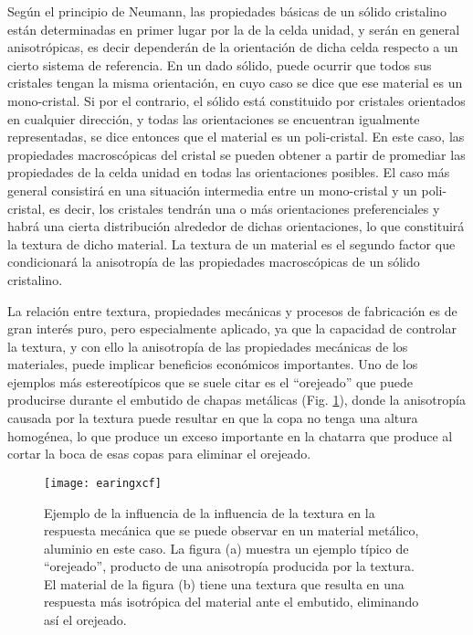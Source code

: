 Según el principio de Neumann\cite{nye1985physical}, las propiedades básicas de un sólido cristalino están determinadas en primer lugar por la de la celda unidad, y serán en general anisotrópicas, es decir dependerán de la orientación de dicha celda respecto a un cierto sistema de referencia.
En un dado sólido, puede ocurrir que todos sus cristales tengan la misma orientación, en cuyo caso se dice que ese material es un mono-cristal.
Si por el contrario, el sólido está constituido por cristales orientados en cualquier dirección, y todas las orientaciones se encuentran igualmente representadas, se dice entonces que el material es un poli-cristal.
En este caso, las propiedades macroscópicas del cristal se pueden obtener a partir de promediar las propiedades de la celda unidad en todas las orientaciones posibles.
El caso más general consistirá en una situación intermedia entre un mono-cristal y un poli-cristal, es decir, los cristales tendrán una o más orientaciones preferenciales y habrá una cierta distribución alrededor de dichas orientaciones, lo que constituirá la textura de dicho material. 
La textura de un material es el segundo factor que condicionará la anisotropía de las propiedades macroscópicas de un sólido cristalino.

La relación entre textura, propiedades mecánicas y procesos de fabricación es de gran interés puro, pero especialmente aplicado, ya que la capacidad de controlar la textura, y con ello la anisotropía de las propiedades mecánicas de los materiales, puede implicar beneficios económicos importantes.
Uno de los ejemplos más estereotípicos que se suele citar es el ``orejeado'' que puede producirse durante el embutido de chapas metálicas (Fig. \ref{fig:earing}), donde la anisotropía causada por la textura puede resultar en que la copa no tenga una altura homogénea, lo que produce un exceso importante en la chatarra que produce al cortar la boca de esas copas para eliminar el orejeado.

\begin{figure}[!htb]
  \centering
  \texttt{[image: earingxcf]}
  \caption{Ejemplo de la influencia de la influencia de la textura en la respuesta mecánica que se puede observar en un material metálico, aluminio en este caso. La figura (a) muestra un ejemplo típico de ``orejeado'', producto de una anisotropía producida por la textura. El material de la figura (b) tiene una textura que resulta en una respuesta más isotrópica del material ante el embutido, eliminando así el orejeado. }
  \label{fig:earing}
\end{figure}

